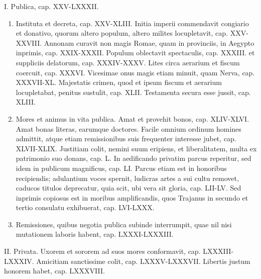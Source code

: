 I. Publica, cap. XXV-LXXXII.
\begin{enumerate}
\item  Instituta et decreta, cap. XXV-XLIII. Initia imperii commendavit congiario et donativo, quorum altero populum, altero milites locupletavit, cap. XXV-XXVIII. Annonam curavit non magis Romae, quam in provinciis, in Aegypto inprimis, cap. XXIX-XXXII. Populum oblectavit spectaculis, cap. XXXIII. et suppliciis delatorum, cap. XXXIV-XXXV. Lites circa aerarium et fiscum coercuit, cap. XXXVI. Vicesimae onus magis etiam minuit, quam Nerva, cap. XXXVII-XL. Majestatis crimen, quod et ipsum fiscum et aerarium locupletabat, penitus sustulit, cap. XLII. Testamenta secura esse jussit, cap. XLIII.
\item Mores et animus in vita publica. Amat et provehit bonos, cap. XLIV-XLVI. Amat bonas literas, earumque doctores. Facile omnium ordinum homines admittit, atque etiam remissionibus suis frequenter interesse jubet, cap. XLVII-XLIX. Justitiam colit, nemini suum eripiens, et liberalitatem, multa ex patrimonio suo donans, cap. L. In aedificando privatim parcus reperitur, sed idem in publicum magnificus, cap. LI. Parcus etiam est in honoribus recipiendis; adulantium voces spernit, ludicras artes a sui cultu removet, caducos titulos deprecatur, quia scit, ubi vera sit gloria, cap. LII-LV. Sed inprimis copiosus est in moribus amplificandis, quos Trajanus in secundo et tertio consulatu exhibuerat, cap. LVI-LXXX.
\item Remissiones, quibus negotia publica subinde interrumpit, quae nil nisi mutationem laboris habent, cap. LXXXI-LXXXIII.
\end{enumerate}
II. Privata. Uxorem et sororem ad suos mores conformavit, cap. LXXXIII-LXXXIV. Amicitiam sanctissime colit, cap. LXXXV-LXXXVII. Libertis justum honorem habet, cap. LXXXVIII.


